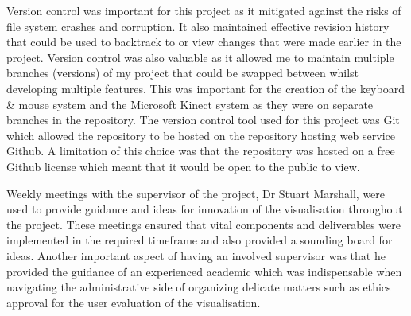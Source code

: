 Version control was important for this project as it mitigated against the risks
of file system crashes and corruption. It also maintained effective revision
history that could be used to backtrack to or view changes that were made
earlier in the project. Version control was also valuable as it allowed me to
maintain multiple branches (versions) of my project that could be swapped between whilst developing multiple features.
This was important for the creation of the keyboard \& mouse system and the
Microsoft Kinect system as they were on separate branches in the repository. 
The version control tool used for this project was Git which allowed
 the repository to be hosted on the repository hosting web service Github. A
limitation of this choice was that the repository was hosted on a free Github license which meant that it would be open to the public to view.

Weekly meetings with the supervisor of the project, Dr Stuart Marshall, were
used to provide guidance and ideas for innovation of the visualisation
throughout the project. These meetings ensured that vital components and
deliverables were implemented in the required timeframe and also provided a
sounding board for ideas.
Another important aspect of having an involved supervisor was that he provided the guidance of an experienced academic which was indispensable when
navigating the administrative side of organizing delicate matters such as ethics
approval for the user evaluation of the visualisation.
